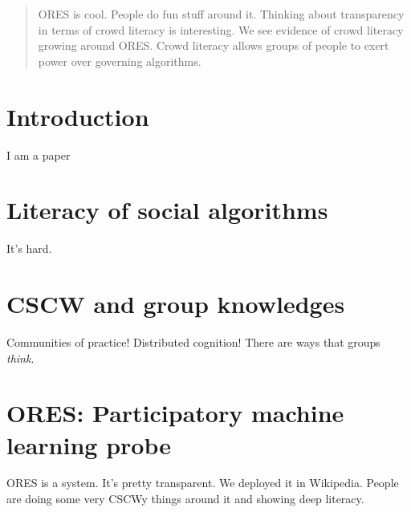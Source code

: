 \documentclass{sigchi-ext}
\begin{document}

\maketitle

\RaggedRight{}

\begin{abstract}
ORES is cool.  People do fun stuff around it.  Thinking
about transparency in terms of crowd literacy is interesting.
We see evidence of crowd literacy growing around ORES.
Crowd literacy allows groups of people to exert power
over governing algorithms.
\end{abstract}

\keywords{\plainkeywords}


\section{Introduction}
I am a paper

\section{Literacy of social algorithms}
It's hard.

\section{CSCW and group knowledges}
Communities of practice!  Distributed cognition!  There are ways that groups \emph{think}.\cite{crawford2016algorithm}

\section{ORES: Participatory machine learning probe}
ORES is a system.  It's pretty transparent.  We deployed it in Wikipedia.  People are doing some very CSCWy things around it and showing deep literacy.
\end{document}
